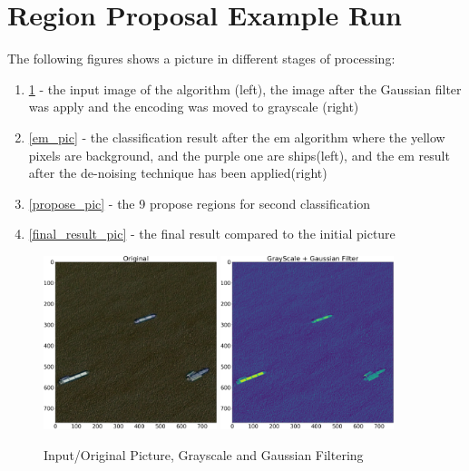 \section{Region Proposal Example Run}
The following figures shows a picture in different stages of processing:
\begin{enumerate}
	\item \ref{orig_pic} - the input image of the algorithm (left), the image after the Gaussian filter was apply and the encoding was moved to grayscale (right)
	\item \ref{em_pic} - the classification result after the em algorithm where the yellow pixels are background, and the purple one are ships(left), and the em result after the de-noising technique has been applied(right)
	\item \ref{propose_pic} - the 9 propose regions for second classification
	\item \ref{final_result_pic} - the final result compared to the initial picture
\end{enumerate}

\begin{figure}[h]
	\centering
	\includegraphics[width=0.45\textwidth]{Pictures/011Original.png}
	\includegraphics[width=0.45\textwidth]{Pictures/011GrayScale.png}
	\caption{Input/Original Picture, Grayscale and Gaussian Filtering}
	\label{orig_pic}
\end{figure}

